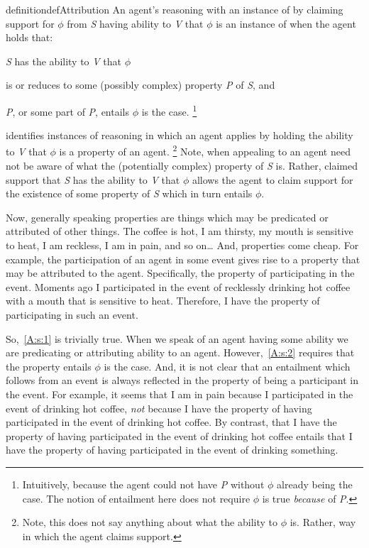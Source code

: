 \begin{note}
  \begin{restatable}[\AR{}]{definition}{defAttribution}\label{AR:def}
    An agent's reasoning with an instance of  by claiming support for \(\phi\) from \emph{S} having ability to \emph{V} that \(\phi\) is an instance of \emph{\AR{}} when the agent holds that:

    \emph{S} has the ability to \emph{V} that \(\phi\)
    \begin{enumerate*}[label=(\textsf{A}\arabic*), ref=(\textsf{A}\arabic*)]
    \item\label{A:s:1} is or reduces to some (possibly complex) property \emph{P} of \emph{S}, and
    \item\label{A:s:2} \emph{P}, or some part of \emph{P}, entails \(\phi\) is the case.\nolinebreak
      \footnote{Intuitively, because the agent could not have \emph{P} without \(\phi\) already being the case.
      The notion of entailment here does not require \(\phi\) is true \emph{because} of \emph{P}.}
    \end{enumerate*}
  \end{restatable}
  
  {
    \color{red}
    \AR{} identifies instances of reasoning in which an agent applies  by holding the ability to \emph{V} that \(\phi\) is a property of an agent.\nolinebreak
    \footnote{
      Note, this does not say anything about what the ability to \(\phi\) is.
      Rather, way in which the agent claims support.
    }
    Note, when appealing to  an agent need not be aware of what the (potentially complex) property of \emph{S} is.
    Rather, claimed support that \emph{S} has the ability to \emph{V} that \(\phi\) allows the agent to claim support for the existence of some property of \emph{S} which in turn entails \(\phi\).
  }

  Now, generally speaking properties are things which may be predicated or attributed of other things.
  The coffee is hot, I am thirsty, my mouth is sensitive to heat, I am reckless, I am in pain, and so on\dots
  And, properties come cheap.
  For example, the participation of an agent in some event gives rise to a property that may be attributed to the agent.
  Specifically, the property of participating in the event.
  Moments ago I participated in the event of recklessly drinking hot coffee with a mouth that is sensitive to heat.
  Therefore, I have the property of participating in such an event.

  So,~\ref{A:s:1} is trivially true.
  When we speak of an agent having some ability we are predicating or attributing ability to an agent.
  However,~\ref{A:s:2} requires that the property entails \(\phi\) is the case.
  And, it is not clear that an entailment which follows from an event is always reflected in the property of being a participant in the event.
  For example, it seems that I am in pain because I participated in the event of drinking hot coffee, \emph{not} because I have the property of having participated in the event of drinking hot coffee.
  By contrast, that I have the property of having participated in the event of drinking hot coffee entails that I have the property of having participated in the event of drinking something.


\end{note}
